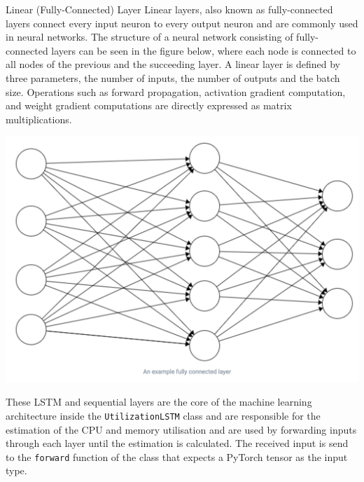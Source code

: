   \begin{pabox}{Linear (Fully-Connected) Layer}
    \label{def:linear-layer-definition}
    Linear layers, also known as fully-connected layers connect every input neuron to every output neuron and are commonly used in neural networks. The structure of a neural network consisting of fully-connected layers can be seen in the figure below, where each node is connected to all nodes of the previous and the succeeding layer.
    A linear layer is defined by three parameters, the number of inputs, the number of outputs and the batch size.
    Operations such as forward propagation, activation gradient computation, and weight gradient computations are directly expressed as matrix multiplications.
    \begin{minipage}[t]{1\linewidth}
      \centering
      \vspace*{0pt}
          \includegraphics[height=0.25\textheight,width=0.5\linewidth]{figures/fc_layer.png}
          \label{fig:fully-connected-layers-architecture}
      \end{minipage}
  \end{pabox}
  These LSTM and sequential layers are the core of the machine learning architecture inside the \texttt{UtilizationLSTM} class and are responsible for the estimation of the CPU and memory utilisation and are used by forwarding inputs through each layer until the estimation is calculated.
  The received input is send to the \texttt{forward} function of the class that expects a PyTorch tensor as the input type.

   
  
